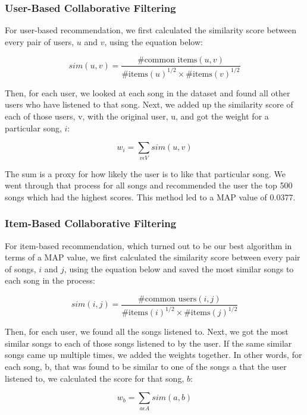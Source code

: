 \documentclass[12pt,preprint]{aastex}
\begin{document}
\subsubsection{User-Based Collaborative Filtering}

For user-based recommendation, we first calculated the similarity score between every pair of users, $u$ and $v$, using the equation below:

\begin{equation}
sim(u,v) = \frac{\text{\# common items}(u, v)}{{\text{\# items}(u)}^{1/2} \times {\text{\# items}(v)}^{1/2}}
\end{equation}

Then, for each user, we looked at each song in the dataset and found all other users who have listened to that song. Next, we added up the similarity score of each of those users, v, with the original user, u, and got the weight for a particular song, $i$:  

$$w_i = \sum_{v \epsilon V} sim(u, v)$$

The sum is a proxy for how likely the user is to like that particular song. We went through that process for all songs and recommended the user the top 500 songs which had the highest scores. This method led to a MAP value of 0.0377.

\subsubsection{Item-Based Collaborative Filtering}

For item-based recommendation, which turned out to be our best algorithm in terms of a MAP value, we first calculated the similarity score between every pair of songs, $i$ and $j$, using the equation below and saved the most similar songs to each song in the process:

\begin{equation}
sim(i,j) = \frac{\text{\# common users}(i, j)}{{\text{\# items}(i)}^{1/2} \times {\text{\# items}(j)}^{1/2}}
\end{equation}

Then, for each user, we found all the songs listened to. Next, we got the most similar songs to each of those songs listened to by the user. If the same similar songs came up multiple times, we added the weights together. In other words, for each song, b, that was found to be similar to one of the songs a that the user listened to, we calculated the score for that song, $b$:

$$w_b = \sum_{a \epsilon A} sim(a, b)$$
\end{document}
